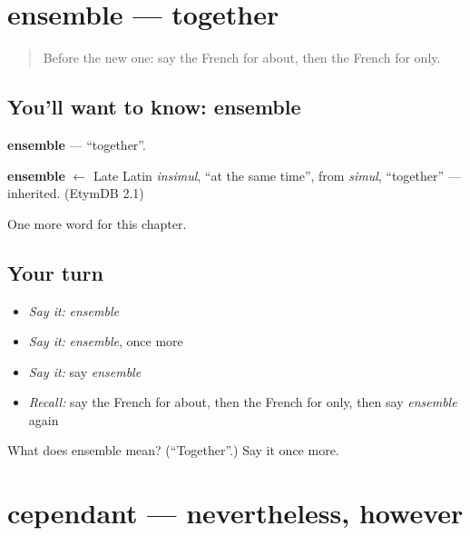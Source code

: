 \section[ensemble]{ensemble — together}

\label{lesson:FR-C217-ensemble}



\begin{quote}
Before the new one: say the French for about, then the French for only.
\end{quote}

\subsection*{You'll want to know: ensemble}
\textbf{ensemble} — \textquotedblleft{}together\textquotedblright{}.

\begin{cousinweb}
\textbf{ensemble} $\leftarrow$ Late Latin \emph{insimul}, \textquotedblleft{}at the same time\textquotedblright{}, from \emph{simul}, \textquotedblleft{}together\textquotedblright{} — inherited. (EtymDB 2.1)
\end{cousinweb}

\begin{grammarlens}[title={What you've built}]
One more word for this chapter.
\end{grammarlens}

\subsection*{Your turn}
\begin{itemize}
\raggedright
  \item \emph{Say it:} \emph{ensemble}
  \item \emph{Say it:} \emph{ensemble}, once more
  \item \emph{Say it:} say \emph{ensemble}
  \item \emph{Recall:} say the French for about, then the French for only, then say \emph{ensemble} again
\end{itemize}

\begin{tcolorbox}[breakable,colback=teal!4,colframe=teal!35!black,title={Before you move on}]
What does ensemble mean? (\textquotedblleft{}Together\textquotedblright{}.) Say it once more.
\end{tcolorbox}
\section[cependant]{cependant — nevertheless, however}

